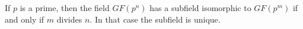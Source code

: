 If $p$ is a prime, then the field $GF(p^n)$ has a subfield isomorphic to $GF(p^m)$ if and only if $m$ divides $n$. In that case the subfield is unique.
